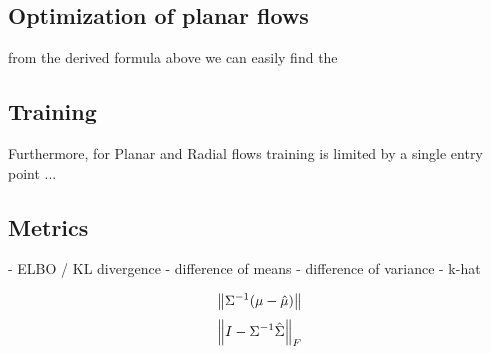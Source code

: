 \subsection{Optimization of planar flows}

from the derived formula above we can easily find the 

\subsection{Training}

Furthermore, for Planar and Radial flows training is limited by a single entry point ...
\cite{berg2019sylvester, kingma2016improved}

\subsection{Metrics}

- ELBO / KL divergence
- difference of means
- difference of variance
- k-hat

\begin{equation*}
    \left\lVert\Sigma^{-1} (\mu - \hat{\mu})\right\rVert
\end{equation*}
\begin{equation*}
    \left\lVert I - \Sigma^{-1} \hat{\Sigma}\right\rVert_F
\end{equation*}


